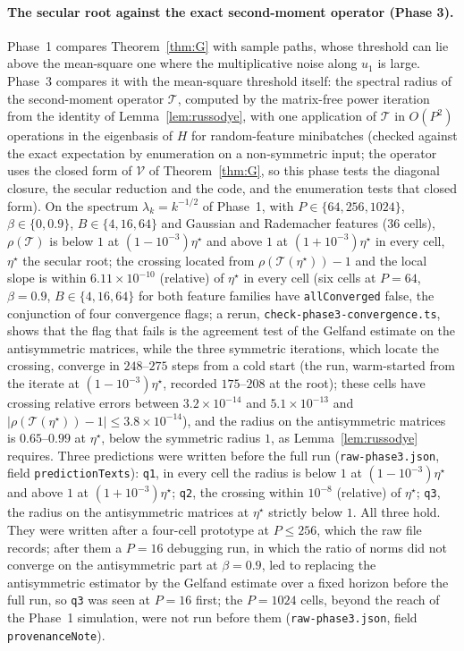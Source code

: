 \documentclass[11pt]{article}
\theoremstyle{remark}
\begin{document}
\paragraph{The secular root against the exact second-moment operator (Phase 3).}
Phase~1 compares Theorem~\ref{thm:G} with sample paths, whose threshold can lie above the mean-square one where the multiplicative noise along $u_1$ is large. Phase~3 compares it with the mean-square threshold itself: the spectral radius of the second-moment operator $\mathcal T$, computed by the matrix-free power iteration from the identity of Lemma~\ref{lem:russodye}, with one application of $\mathcal T$ in $O(P^2)$ operations in the eigenbasis of $H$ for random-feature minibatches (checked against the exact expectation by enumeration on a non-symmetric input; the operator uses the closed form of $\mathcal V$ of Theorem~\ref{thm:G}, so this phase tests the diagonal closure, the secular reduction and the code, and the enumeration tests that closed form). On the spectrum $\lambda_k=k^{-1/2}$ of Phase~1, with $P\in\{64,256,1024\}$, $\beta\in\{0,0.9\}$, $B\in\{4,16,64\}$ and Gaussian and Rademacher features (36 cells), $\rho(\mathcal T)$ is below $1$ at $(1-10^{-3})\eta^\star$ and above $1$ at $(1+10^{-3})\eta^\star$ in every cell, $\eta^\star$ the secular root; the crossing located from $\rho(\mathcal T(\eta^\star))-1$ and the local slope is within $6.11\times10^{-10}$ (relative) of $\eta^\star$ in every cell (six cells at $P=64$, $\beta=0.9$, $B\in\{4,16,64\}$ for both feature families have \texttt{allConverged} false, the conjunction of four convergence flags; a rerun, \texttt{check-phase3-convergence.ts}, shows that the flag that fails is the agreement test of the Gelfand estimate on the antisymmetric matrices, while the three symmetric iterations, which locate the crossing, converge in $248$--$275$ steps from a cold start (the run, warm-started from the iterate at $(1-10^{-3})\eta^\star$, recorded $175$--$208$ at the root); these cells have crossing relative errors between $3.2\times10^{-14}$ and $5.1\times10^{-13}$ and $|\rho(\mathcal T(\eta^\star))-1|\le3.8\times10^{-14}$), and the radius on the antisymmetric matrices is $0.65$--$0.99$ at $\eta^\star$, below the symmetric radius $1$, as Lemma~\ref{lem:russodye} requires. Three predictions were written before the full run (\texttt{raw-phase3.json}, field \texttt{predictionTexts}): \texttt{q1}, in every cell the radius is below $1$ at $(1-10^{-3})\eta^\star$ and above $1$ at $(1+10^{-3})\eta^\star$; \texttt{q2}, the crossing within $10^{-8}$ (relative) of $\eta^\star$; \texttt{q3}, the radius on the antisymmetric matrices at $\eta^\star$ strictly below $1$. All three hold. They were written after a four-cell prototype at $P\le256$, which the raw file records; after them a $P=16$ debugging run, in which the ratio of norms did not converge on the antisymmetric part at $\beta=0.9$, led to replacing the antisymmetric estimator by the Gelfand estimate over a fixed horizon before the full run, so \texttt{q3} was seen at $P=16$ first; the $P=1024$ cells, beyond the reach of the Phase~1 simulation, were not run before them (\texttt{raw-phase3.json}, field \texttt{provenanceNote}).
\end{document}
